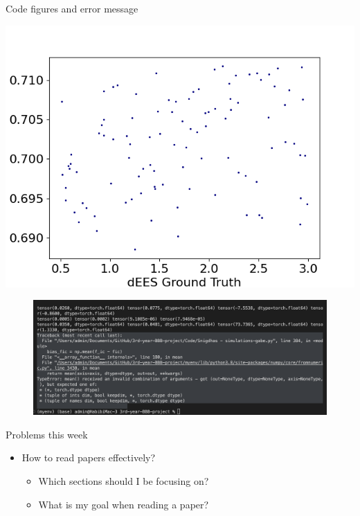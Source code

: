 \documentclass{beamer}
\begin{document}
\begin{frame}{Code figures and error message}
  \begin{minipage}[b]{0.4\linewidth}
  \centering
    \includegraphics[width=\linewidth]{Weekly meeting slides/meeting 2/Figure_5.png} 
  \end{minipage} 
  \begin{figure}
      \centering
      \includegraphics[width=\linewidth]{Weekly meeting slides/meeting 2/Screenshot 2023-10-31 at 1.46.04 pm.png}
      \label{fig:enter-label}
  \end{figure}
\end{frame}

\begin{frame}{Problems this week}
        \begin{itemize}
        \item How to read papers effectively?
        \begin{itemize}
            \item Which sections should I be focusing on?
            \item What is my goal when reading a paper?
        \end{itemize}
        \end{itemize}
\end{frame}
\end{document}
